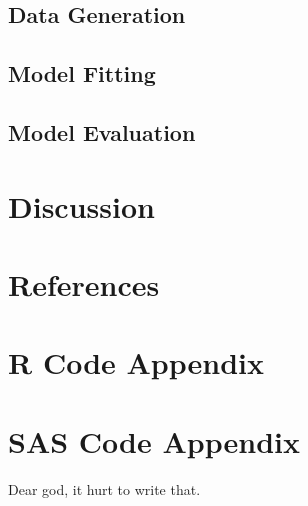 \documentclass{article}\usepackage[]{graphicx}\usepackage[]{color}
\begin{document}
\subsection{Data Generation}



\subsection{Model Fitting}



\subsection{Model Evaluation}



\section{Discussion}



\section{References}



\newpage 

\section{R Code Appendix}


\section{SAS Code Appendix}

Dear god, it hurt to write that. 
\end{document}
